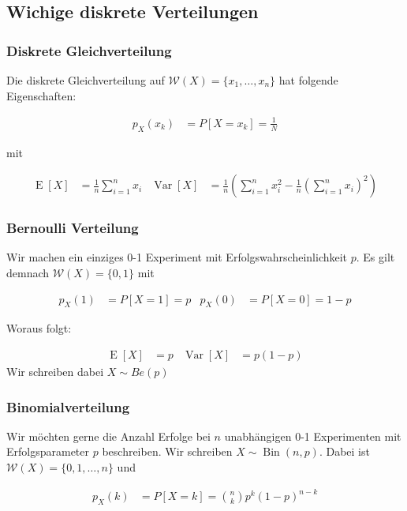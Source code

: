 \documentclass[25pt]{sciposter}
\newcommand{\W}{\mathcal{W}}
\newcommand{\Var}{\operatorname{Var}}
\newcommand{\E}{\operatorname{E}}
\begin{document}
\begin{multicols}{3}
		
		
		\section{Wichige diskrete Verteilungen}
		
		\subsubsection*{Diskrete Gleichverteilung}
		Die diskrete Gleichverteilung auf  $\W(X)=\{x_1,\ldots,x_n\}$ hat folgende Eigenschaften:
		
		\begin{align*}
			p_X(x_k) &= P[X = x_k] = \frac{1}{N}
		\end{align*}
		
		mit 
		
		\begin{align*}
			\operatorname {E}[X]&={\frac  {1}{n}}\sum _{{i=1}}^{n}x_{i} & \operatorname {Var}[X]&={\frac  {1}{n}}\left(\sum _{{i=1}}^{n}x_{i}^{2}-{\frac  {1}{n}}\left(\sum _{{i=1}}^{n}x_{i}\right)^{2}\right)
		\end{align*}
		
		\subsubsection*{Bernoulli Verteilung}
		Wir machen ein einziges 0-1 Experiment mit Erfolgswahrscheinlichkeit $p$. Es gilt demnach $\W(X) = \{0,1\}$ mit 
		
		\begin{align*}
			p_X(1) &= P[X=1] = p & 	p_X(0) &= P[X=0] = 1-p
		\end{align*}
		
		Woraus folgt:
		
		\begin{align*}
			\E[X] &= p & \Var[X] &= p(1-p)
		\end{align*}
		Wir schreiben dabei $X\sim {Be}(p)$
		
		\subsubsection*{Binomialverteilung}
		Wir möchten gerne die Anzahl Erfolge bei $n$ unabhängigen 0-1 Experimenten mit Erfolgsparameter $p$ beschreiben. Wir schreiben $X \sim \operatorname{Bin}(n,p)$. Dabei ist $\W(X) = \{0,1,\ldots,n\}$ und 
		
		\begin{align*}
			p_X(k) &= P[X=k] = {n \choose k} p^k (1-p)^{n-k}
		\end{align*}
		

\end{multicols}
\end{document}
